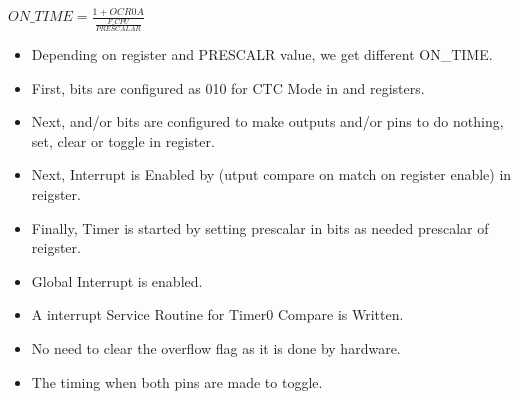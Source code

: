 \begin{center}
    $ON\_TIME = \frac{1 + OCR0A}{\frac{F\_CPU}{PRESCALAR}}$
\end{center}
\begin{itemize}
    \item Depending on  register and PRESCALR value, we get different ON\_TIME.
    \item First,  bits are configured as 010 for CTC Mode in  and  registers.
    \item Next,  and/or  bits are configured to make outputs  and/or  pins to do nothing, set, clear or toggle in  register.
    \item Next, Interrupt is Enabled by  (utput compare on match on  register enable) in  reigster.
    \item Finally, Timer is started by setting prescalar in  bits as needed prescalar of  reigster.
    \item Global Interrupt is enabled.
    \item A interrupt Service Routine for Timer0 Compare is Written.
    \item No need to clear the overflow flag as it is done by hardware.
    \item The timing when both pins  are made to toggle.
\end{itemize}


